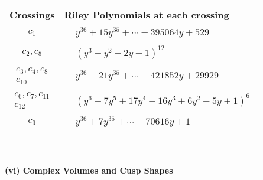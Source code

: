 \documentclass[1p]{elsarticle_modified}
\theoremstyle{definition}
\begin{document}
\begin{tabular}{m{50pt}|m{274pt}}
Crossings & \hspace{64pt}Riley Polynomials at each crossing \\
\hline $$\begin{aligned}c_{1}\end{aligned}$$&$\begin{aligned}
&y^{36}+15 y^{35}+\cdots-395064 y+529
\end{aligned}$\\
\hline $$\begin{aligned}c_{2},c_{5}\end{aligned}$$&$\begin{aligned}
&(y^3- y^2+2 y-1)^{12}
\end{aligned}$\\
\hline $$\begin{aligned}c_{3},c_{4},c_{8}\\c_{10}\end{aligned}$$&$\begin{aligned}
&y^{36}-21 y^{35}+\cdots-421852 y+29929
\end{aligned}$\\
\hline $$\begin{aligned}c_{6},c_{7},c_{11}\\c_{12}\end{aligned}$$&$\begin{aligned}
&(y^6-7 y^5+17 y^4-16 y^3+6 y^2-5 y+1)^6
\end{aligned}$\\
\hline $$\begin{aligned}c_{9}\end{aligned}$$&$\begin{aligned}
&y^{36}+7 y^{35}+\cdots-70616 y+1
\end{aligned}$\\
\hline
\end{tabular}\\~\\
\newpage\flushleft \textbf{(vi) Complex Volumes and Cusp Shapes}
\end{document}
